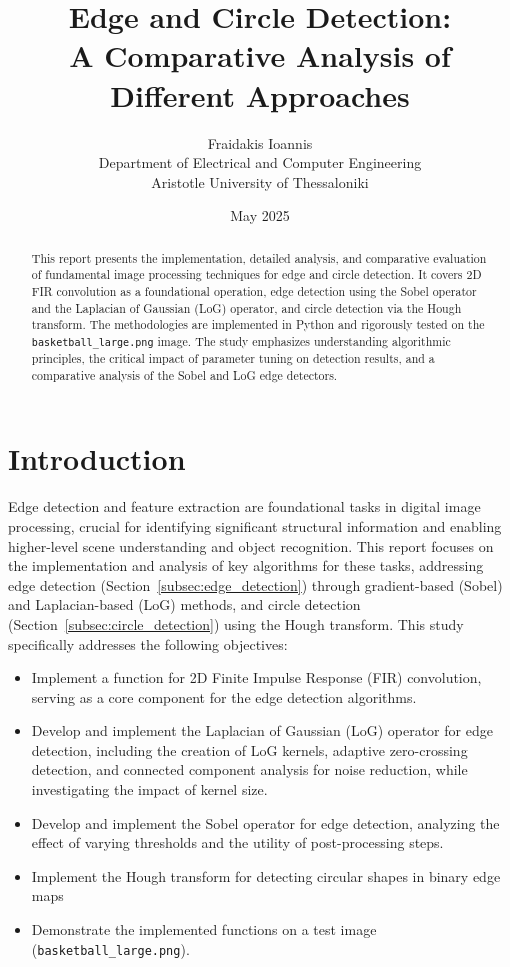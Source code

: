 \documentclass[12pt,a4paper]{article}
\title{\Large \textbf{Edge and Circle Detection:\\A Comparative Analysis of Different Approaches}}
\author{Fraidakis Ioannis\\
\small Department of Electrical and Computer Engineering\\
\small Aristotle University of Thessaloniki}
\date{May 2025}
\begin{document}
\maketitle

\begin{abstract}
This report presents the implementation, detailed analysis, and comparative evaluation of fundamental image processing techniques for edge and circle detection. It covers 2D FIR convolution as a foundational operation, edge detection using the Sobel operator and the Laplacian of Gaussian (LoG) operator, and circle detection via the Hough transform. The methodologies are implemented in Python and rigorously tested on the \texttt{basketball\_large.png} image. The study emphasizes understanding algorithmic principles, the critical impact of parameter tuning on detection results, and a comparative analysis of the Sobel and LoG edge detectors. 
\end{abstract}

\section{Introduction}

Edge detection and feature extraction are foundational tasks in digital image processing, crucial for identifying significant structural information and enabling higher-level scene understanding and object recognition. This report focuses on the implementation and analysis of key algorithms for these tasks, addressing edge detection (Section~\ref{subsec:edge_detection}) through gradient-based (Sobel) and Laplacian-based (LoG) methods, and circle detection (Section~\ref{subsec:circle_detection}) using the Hough transform. This study specifically addresses the following objectives:

\begin{itemize}
    \item Implement a function for 2D Finite Impulse Response (FIR) convolution, serving as a core component for the edge detection algorithms.

    \item Develop and implement the Laplacian of Gaussian (LoG) operator for edge detection, including the creation of LoG kernels, adaptive zero-crossing detection, and connected component analysis for noise reduction, while investigating the impact of kernel size.

    \item Develop and implement the Sobel operator for edge detection, analyzing the effect of varying thresholds and the utility of post-processing steps.
    
    \item Implement the Hough transform for detecting circular shapes in binary edge maps 
    \item Demonstrate the implemented functions on a test image (\texttt{basketball\_large.png}).
\end{itemize}
\end{document}
